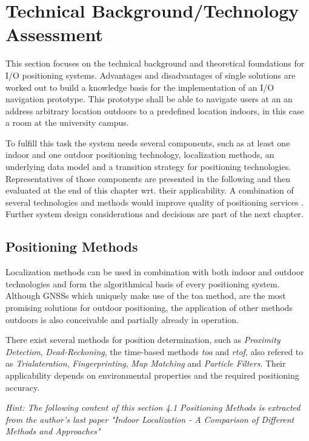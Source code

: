 \chapter{Technical Background/Technology Assessment}

This section focuses on the technical background and theoretical foundations for I/O positioning systems. Advantages and disadvantages of single solutions are worked out to build a knowledge basis for the implementation of an I/O navigation prototype.
This prototype shall be able to navigate users at an an address arbitrary location outdoors to a predefined location indoors, in this case a room at the university campus.

To fulfill this task the system needs several components, such as at least one indoor and one outdoor positioning technology, localization methods, an underlying data model and a transition strategy for positioning technologies.
Representatives of those components are presented in the following and then evaluated at the end of this chapter wrt. their applicability. A combination of several technologies and methods would improve quality of positioning services \cite{challengesLBS}. Further system design considerations and decisions are part of the next chapter. 


\section{Positioning Methods}

Localization methods can be used in combination with both indoor and outdoor technologies and form the algorithmical basis of every positioning system.
Although GNSSs which uniquely make use of the \ac{toa} method, are the most promising solutions for outdoor positioning, the application of other methods outdoors is also conceivable and partially already in operation.

There exist several methods for position determination, such as \textit{Proximity Detection}, \textit{Dead-Reckoning}, the time-based methods \textit{\ac{toa}} and \textit{\ac{rtof}}, also refered to as \textit{Trialateration}, \textit{Fingerprinting}, \textit{Map Matching} and \textit{Particle Filters}. 
Their applicability depends on environmental properties and the required positioning accuracy.

\textit{Hint: The following content of this section \emph{4.1 Positioning Methods} is extracted from the author's last paper "Indoor Localization - A Comparison of Different Methods and Approaches"}

